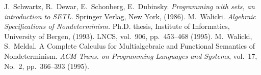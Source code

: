 \begin{thebibliography}{MM99}
 J.~Schwartz, R.~Dewar, E.~Schonberg, E.~Dubinsky. 
   {\it Programming with sets, an introduction to SETL. }
   Springer Verlag, New York, (1986).
 M.~Walicki. 
   {\it Algebraic Specifications of Nondeterminism.}
   Ph.D. thesis, Institute of Informatics, University of Bergen, (1993).
   LNCS, vol.~906, pp.~453--468 (1995).
 M.~Walicki, S.~Meldal. A Complete Calculus for 
   Multialgebraic and Functional Semantics of Nondeterminism. 
   {\it ACM Trans. on Programming Languages and Systems}, vol.~17, No.~2,
   pp.~366--393 (1995).
\end{thebibliography} 
